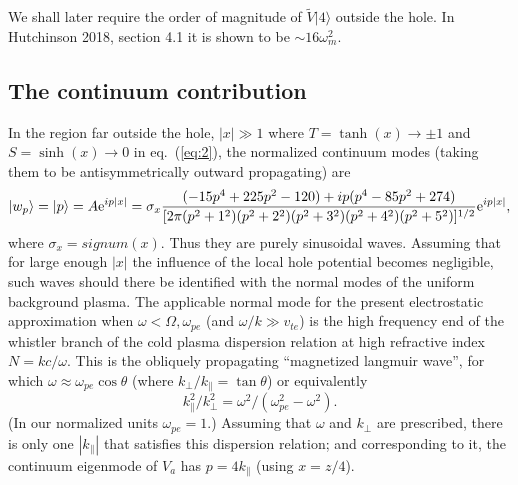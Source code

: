 \documentclass[12pt]{article}
\def\ket#1{|#1\rangle}
\def\etothe#1{{\rm e}^{#1}}
\begin{document}
We shall later require  the order of magnitude of $\tilde V\ket{4}$
outside the hole.  In Hutchinson 2018,
section 4.1 it is shown to be $\sim 16\omega_m^2$.


\subsection{The continuum contribution}

In the region far outside the hole, $|x|\gg 1$ where
$T=\tanh(x)\to\pm1$ and $S=\sinh(x)\to0$ in eq.\ (\ref{eq:2}), the
normalized continuum modes (taking them to be antisymmetrically
outward propagating) are
\begin{equation}
  \label{eq:14}
 \ket{w_p}= \ket{p}=A\etothe{ip|x|}=\sigma_x{(-15p^4+225p^2-120) +ip (p^{4}-85p^{2}+274)\over
      [2\pi(p^2+1^2)(p^2+2^2)(p^2+3^2)(p^2+4^2)(p^2+5^2)]^{1/2}}\etothe{ip|x|},
\end{equation}
where $\sigma_x=signum(x)$. Thus they are purely sinusoidal
waves. Assuming that for large enough $|x|$ the influence of the local
hole potential becomes negligible, such waves should there be
identified with the normal modes of the uniform background plasma.
The applicable normal mode for the present electrostatic approximation
when $\omega<\Omega,\omega_{pe}$ (and $\omega/k\gg v_{te}$) is the high
frequency end of the whistler branch of the cold plasma dispersion
relation at high refractive index $N=kc/\omega$. This is the obliquely
propagating ``magnetized langmuir wave'', for which
$\omega\approx\omega_{pe}\cos\theta$ (where
$k_\perp/k_\parallel=\tan\theta$) or equivalently
\begin{equation}
  \label{eq:15}
  k_\parallel^2/k_\perp^2=\omega^2/(\omega_{pe}^2-\omega^2).
\end{equation}
(In our normalized units $\omega_{pe}=1$.)  Assuming that $\omega$ and
$k_\perp$ are prescribed, there is only one $|k_\parallel|$ that
satisfies this dispersion relation; and corresponding to it, the
continuum eigenmode of $V_a$ has $p=4k_\parallel$ (using $x=z/4$).
\end{document}
